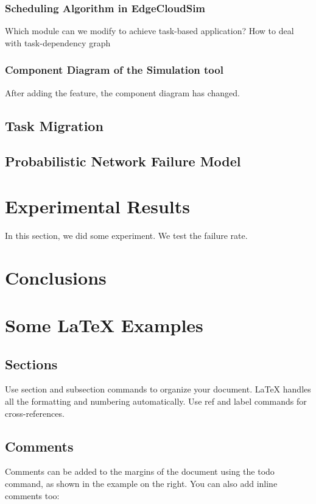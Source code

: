 \subsubsection{Scheduling Algorithm in EdgeCloudSim}
Which module can we modify to achieve task-based application?
How to deal with task-dependency graph

\subsubsection{Component Diagram of the Simulation tool}
After adding the feature, the component diagram has changed.

\subsection{Task Migration}

\subsection{Probabilistic Network Failure Model}

\section{Experimental Results}
In this section, we did some experiment. We test the failure rate.

\section{Conclusions}


\section{Some \LaTeX{} Examples}
\label{sec:examples}

\subsection{Sections}

Use section and subsection commands to organize your document. \LaTeX{} handles all the formatting and numbering automatically. Use ref and label commands for cross-references.

\subsection{Comments}

Comments can be added to the margins of the document using the  todo command, as shown in the example on the right. You can also add inline comments too:

